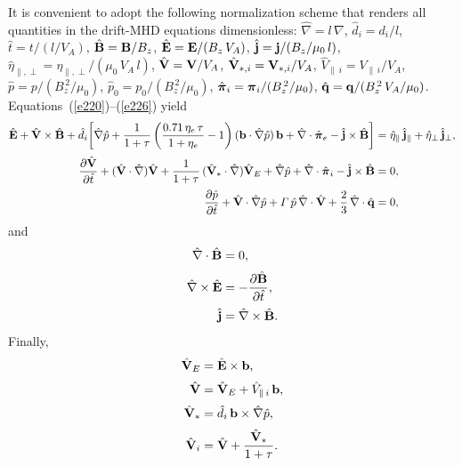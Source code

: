 \documentclass[notitlepage,12pt]{article}
\newcommand{\bpi}{\mbox{\boldmath$\pi$}}
\begin{document}
It is convenient to adopt the following normalization scheme that renders all quantities in the drift-MHD equations dimensionless: 
$\hat{\nabla} = l\,\nabla$, $\hat{d}_i=d_i/l$, $\hat{t} = t/(l/V_A)$, $\hat{\bf B} = {\bf B}/B_z$, $\hat{\bf E} = {\bf E}/(B_z\,V_A)$,
$\hat{\bf j} = {\bf j}/(B_z/\mu_0\,l)$, $\hat{\eta}_{\parallel,\perp} = \eta_{\parallel,\perp}/(\mu_0\,V_A\,l)$, $\hat{\bf V} = {\bf V}/V_A$,
$\hat{{\bf V}}_{\ast,i}= {\bf V}_{\ast,i}/V_A$, $\hat{V}_{\parallel\,i}= V_{\parallel\,i}/V_A$, $\hat{p} = p/(B_z^{\,2}/\mu_0)$, $\hat{p}_0 = p_0/(B_z^{\,2}/\mu_0)$, $\hat{\bpi}_{i} = \bpi_{i}/(B_z^{\,2}/\mu_0)$,
$\hat{\bf q} = {\bf q} /(B_z^{\,2}\,V_A/\mu_0)$. Equations~(\ref{e220})--(\ref{e226}) yield
\begin{align}\label{e227}
\hat{\bf E} + \hat{\bf V}\times \hat{\bf B} + \hat{d}_i\!\left[\hat{\nabla} \hat{p} + \frac{1}{1+\tau}\left(\frac{0.71\,\eta_e\,\tau}{1+\eta_e}-1\right)({\bf b}\cdot\hat{\nabla} \hat{p})\,{\bf b} + \hat{\nabla}\cdot\hat{\bpi}_e-\hat{\bf j}\times\hat{\bf B}\right] &= \hat{\eta}_\parallel\,\hat{\bf j}_\parallel+ \hat{\eta}_\perp\,\hat{\bf j}_\perp,\\[0.5ex]
\frac{\partial \hat{\bf V}}{\partial \hat{t}} 
+ (\hat{\bf V}\cdot\hat{\nabla} )\hat{\bf V} + 
\frac{1}{1+\tau}\,(\hat{\bf V}_\ast\cdot\hat{\nabla})\hat{\bf V}_E
+ \hat{\nabla} \hat{p} + \hat{\nabla}\cdot\hat{\bpi}_i -
 \hat{\bf j}\times \hat{\bf B} &= 0,
 \\[0.5ex]
\frac{\partial \hat{p}}{\partial \hat{t}} + \hat{\bf V}\cdot\hat{\nabla} \hat{p} + {\mit\Gamma}\,\hat{p}\,\hat{\nabla}\cdot\hat{\bf V} + \frac{2}{3}\,\hat{\nabla}\cdot \hat{\bf q}&= 0,\label{e229}
\end{align}
and
\begin{align}
\hat{\nabla}\cdot\hat{\bf B} &= 0,\label{e230}\\[0.5ex]
\hat{\nabla}\times \hat{\bf E} &= - \frac{\partial \hat{\bf B}}{\partial \hat{t}},\label{e231}\\[0.5ex]
\hat{\bf j} &= \hat{\nabla} \times \hat{\bf B}.\label{e232}
\end{align}
Finally,
\begin{align}
\hat{\bf V}_E &= \hat{\bf E}\times {\bf b},\\[0.5ex]
\hat{\bf V} &= \hat{\bf V}_E + \hat{V}_{\parallel\,i}\,{\bf b},\\[0.5ex]
\hat{\bf V}_\ast &= \hat{d}_i\,{\bf b}\times \hat{\nabla} \hat{p},\\[0.5ex]
\hat{\bf V}_i &= \hat{\bf V} + \frac{\hat{\bf V}_{\ast}}{1+\tau}.
\end{align}
\end{document}
